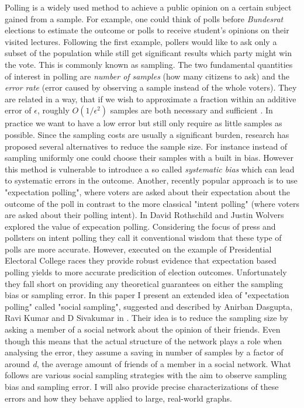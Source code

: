 Polling is a widely used method to achieve a public opinion on a certain subject gained from a sample. For example, one could think of polls before \textit{Bundesrat} elections to estimate the outcome or polls to receive student's opinions on their visited lectures.
Following the first example, pollers would like to ask only a subset of the population while still get significant results which party might win the vote. This is commonly known as sampling.
The two fundamental quantities of interest in polling are \textit{number of samples} (how many citizens to ask) and the \textit{error rate} (error caused by observing a sample instead of the whole voters). They are related in a way, that if we wish to approximate a fraction within an additive error of $\epsilon$, roughly $O(1/\epsilon^{2})$ samples are both necessary and sufficient .\newline
In practice we want to have a low error but still only require as little samples as possible.
Since the sampling costs are usually a significant burden, research has proposed several alternatives to reduce the sample size.\newline
For instance instead of sampling uniformly one could choose their samples with a built in bias.
However this method is vulnerable to introduce a so called \textit{systematic bias} which can lead to systematic errors in the outcome.\newline
Another, recently popular approach is to use "expectation polling", where voters are asked about their expectation about the outcome of the poll in contrast to the more classical "intent polling" (where voters are asked about their polling intent). In \cite{rothschild2009forecasting} David Rothschild and Justin Wolvers explored the value of expecation polling. Considering the focus of press and pollsters on intent polling they call it conventional wisdom that these type of polls are more accurate. However, executed on the example of Presidential Electoral College races they provide robust evidence that expectation based polling yields to more accurate predicition of election outcomes.
Unfortunately they fall short on providing any theoretical guarantees on either the sampling bias or sampling error.\newline
In this paper I present an extended idea of "expectation polling" called "social sampling", suggested and described by Anirban Dasgupta, Ravi Kumar and D Sivakumar in \cite{dasgupta2012social}.
Their idea is to reduce the sampling size by asking a member of a social network about the opinion of their friends.
Even though this means that the actual structure of the network plays a role when analysing the error, they assume a saving in number of samples by a factor of around \textit{d}, the average amount of friends of a member in a social network.\newline
What follows are various social sampling strategies with the aim to observe sampling bias and sampling error.
I will also provide precise characterizations of these errors and how they behave applied to large, real-world graphs.
